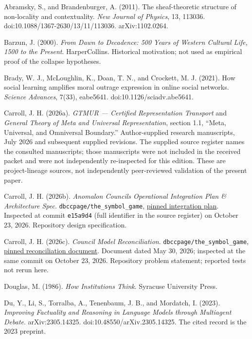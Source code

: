 \documentclass[
  10pt,
]{article}
\begin{document}
Abramsky, S., and Brandenburger, A. (2011). The sheaf-theoretic structure of non-locality and contextuality. \emph{New Journal of Physics}, 13, 113036. doi:10.1088/1367-2630/13/11/113036. arXiv:1102.0264.

Barzun, J. (2000). \emph{From Dawn to Decadence: 500 Years of Western Cultural Life, 1500 to the Present}. HarperCollins. Historical motivation; not used as empirical proof of the collapse hypotheses.

Brady, W. J., McLoughlin, K., Doan, T. N., and Crockett, M. J. (2021). How social learning amplifies moral outrage expression in online social networks. \emph{Science Advances}, 7(33), eabe5641. doi:10.1126/sciadv.abe5641.

Carroll, J. H. (2026a). \emph{GTMUR --- Certified Representation Transport} and \emph{General Theory of Meta and Universal Representation}, section 1.1, ``Meta, Universal, and Omniversal Boundary.'' Author-supplied research manuscripts, July 2026 and subsequent supplied revisions. The supplied source register names the consulted manuscripts; those manuscripts were not included in the received packet and were not independently re-inspected for this edition. These are project-lineage sources, not independently peer-reviewed validation of the present paper.

Carroll, J. H. (2026b). \emph{Anomalon Councils Operational Integration Plan \& Architecture Spec}. \texttt{dbccpage/the\_symbol\_game}, \href{https://github.com/dbccpage/the_symbol_game/blob/e15a9d4ac6298524ce370cae679314aa0fef7585/omega_engine_product_planning_office/plans/epics/plan_anomalon_councils_engine_integration.md}{pinned integration plan}. Inspected at commit \texttt{e15a9d4} (full identifier in the source register) on October 23, 2026. Repository design specification.

Carroll, J. H. (2026c). \emph{Council Model Reconciliation}. \texttt{dbccpage/the\_symbol\_game}, \href{https://github.com/dbccpage/the_symbol_game/blob/e15a9d4ac6298524ce370cae679314aa0fef7585/omega_engine_governance/anomalon_councils/documentation/council_model_reconciliation.md}{pinned reconciliation document}. Document dated May 30, 2026; inspected at the same commit on October 23, 2026. Repository problem statement; reported tests not rerun here.

Douglas, M. (1986). \emph{How Institutions Think}. Syracuse University Press.

Du, Y., Li, S., Torralba, A., Tenenbaum, J. B., and Mordatch, I. (2023). \emph{Improving Factuality and Reasoning in Language Models through Multiagent Debate}. arXiv:2305.14325. doi:10.48550/arXiv.2305.14325. The cited record is the 2023 preprint.
\end{document}
